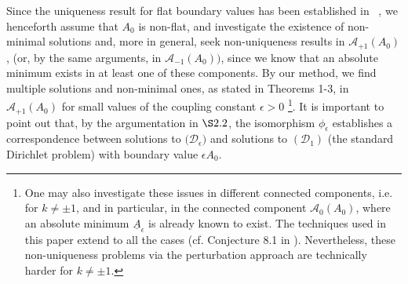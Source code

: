\documentclass[11pt]{article}
\numberwithin{equation}{section} \setlength{\topmargin}{-35pt}
\begin{document}
Since the uniqueness result for flat boundary values has been
established in ~\cite{I}, we henceforth assume that $A_0$ is
non-flat, and investigate the existence of non-minimal solutions
and, more in general, seek non-uniqueness results in
$\mathcal{A}_{+1}(A_0)$, (or, by the same arguments, in
$\mathcal{A}_{-1}(A_0))$, since we know that an absolute minimum
exists in at least one of these components. By our method, we find
multiple solutions and non-minimal ones, as stated in Theorems 1-3,
in $\mathcal{A}_{+1}(A_0)$ for small values of the coupling constant
$\epsilon>0$ %
\footnote{One may also investigate these issues in
different connected components, i.e. for $k\neq \pm
1$, and %
in particular, in the connected component $\mathcal{A}_0(A_0)$,
where an absolute minimum $\underline{A}_{\epsilon}$ is already
known to exist. The techniques used in this paper extend to all the
cases (cf. Conjecture 8.1 in \cite{IM2}). Nevertheless, these
non-uniqueness problems via the perturbation approach are
technically harder for $k\neq \pm 1$.}.  It is important to point
out that, by the argumentation in $\S 2.2$, the isomorphism
$\phi_\epsilon$ establishes a correspondence between solutions to
$\bigl(\mathcal{D}_{\epsilon}\bigr)$ and solutions to
$(\mathcal{D}_1)$ (the standard Dirichlet problem) with boundary
value $\epsilon A_0$.
\end{document}
